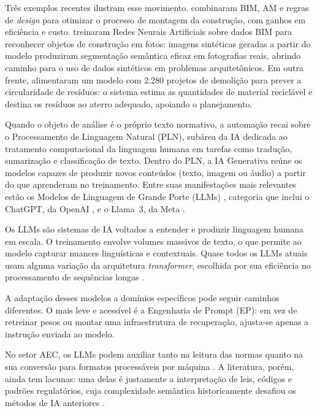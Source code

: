 \documentclass[a4paper,fleqn]{cas-sc}
\begin{document}
Três exemplos recentes ilustram esse movimento. \citet{liu2022} combinaram BIM, AM e regras de \textit{design} para otimizar o processo de montagem da construção, com ganhos em eficiência e custo. \citet{alawadhi2023} treinaram Redes Neurais Artificiais sobre dados BIM para reconhecer objetos de construção em fotos: imagens sintéticas geradas a partir do modelo produziram segmentação semântica eficaz em fotografias reais, abrindo caminho para o uso de dados sintéticos em problemas arquitetônicos. Em outra frente, \citet{saka2024} alimentaram um modelo com 2.280 projetos de demolição para prever a circularidade de resíduos: o sistema estima as quantidades de material reciclável e destina os resíduos ao aterro adequado, apoiando o planejamento.

Quando o objeto de análise é o próprio texto normativo, a automação recai sobre o Processamento de Linguagem Natural (PLN), subárea da IA dedicada ao tratamento computacional da linguagem humana em tarefas como tradução, sumarização e classificação de texto. Dentro do PLN, a IA Generativa reúne os modelos capazes de produzir novos conteúdos (texto, imagem ou áudio) a partir do que aprenderam no treinamento. Entre suas manifestações mais relevantes estão os Modelos de Linguagem de Grande Porte (LLMs) \citep{zhao2023}, categoria que inclui o ChatGPT, da OpenAI \citep{openai2024}, e o Llama~3, da Meta \citep{llama3}.

Os LLMs são sistemas de IA voltados a entender e produzir linguagem humana em escala. O treinamento envolve volumes massivos de texto, o que permite ao modelo capturar nuances linguísticas e contextuais. Quase todos os LLMs atuais usam alguma variação da arquitetura \textit{transformer}, escolhida por sua eficiência no processamento de sequências longas \citep{zhao2023}.

A adaptação desses modelos a domínios específicos pode seguir caminhos diferentes. O mais leve e acessível é a Engenharia de Prompt (EP): em vez de retreinar pesos ou montar uma infraestrutura de recuperação, ajusta-se apenas a instrução enviada ao modelo.

No setor AEC, os LLMs podem auxiliar tanto na leitura das normas quanto na sua conversão para formatos processáveis por máquina \citep{fuchs2024}. A literatura, porém, ainda tem lacunas: uma delas é justamente a interpretação de leis, códigos e padrões regulatórios, cuja complexidade semântica historicamente desafiou os métodos de IA anteriores \citep{fuchs2024}.
\end{document}
